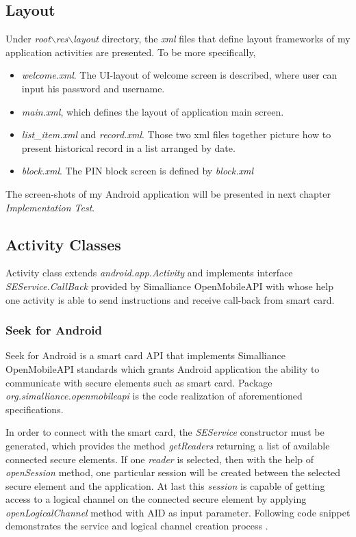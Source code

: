 \subsection{Layout} \label{secLayout}
Under \emph{root$\backslash$res$\backslash$layout} directory, the \emph{xml} files that define layout frameworks of my application activities are presented. To be more specifically,
\begin{itemize}
\item \emph{welcome.xml}. The UI-layout of welcome screen is described, where user can input his password and username.
\item \emph{main.xml}, which defines the layout of application main screen.
\item \emph{list\_item.xml} and \emph{record.xml}. Those two xml files together picture how to present historical record in a list arranged by date.
\item \emph{block.xml}. The PIN block screen is defined by \emph{block.xml}
\end{itemize}
The screen-shots of my Android application will be presented in next chapter \emph{Implementation Test}.


\subsection{Activity Classes}
Activity class extends \emph{android.app.Activity} and implements interface \emph{SEService.CallBack} provided by Simalliance OpenMobileAPI with whose help one activity is able to send instructions and receive call-back from smart card. 
\subsubsection{Seek for Android} \label{secSFA}
Seek for Android is a smart card API that implements Simalliance OpenMobileAPI standards which grants Android application the ability to communicate with secure elements such as smart card. Package \emph{org.simalliance.openmobileapi} is the code realization of aforementioned specifications.

In order to connect with the smart card, the \emph{SEService} constructor must be generated, which provides the method \emph{getReaders} returning a list of available connected secure elements. If one \emph{reader} is selected, then with the help of \emph{openSession} method, one particular session will be created between the selected secure element and the application. At last this \emph{session} is capable of getting access to a logical channel on the connected secure element by applying \emph{openLogicalChannel} method with AID as input parameter. Following code snippet demonstrates the service and logical channel creation process \cite{open}.

